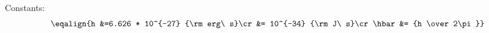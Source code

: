 \vskip 3pt
\hskip -5pt
\vbox{Constants:
$$\eqalign{h &=6.626 * 10^{-27} {\rm erg\ s}\cr
&= 10^{-34} {\rm J\ s}\cr
\hbar &= {h \over 2\pi}}$$
}
